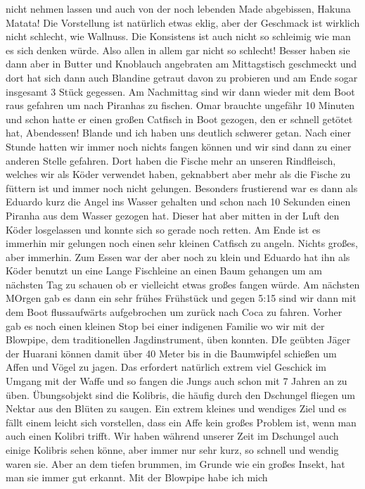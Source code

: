 \documentclass[11pt]{book}
\begin{document}
nicht nehmen lassen und auch von der noch lebenden Made abgebissen, Hakuna Matata! Die Vorstellung ist natürlich etwas eklig, aber der Geschmack ist 
wirklich nicht schlecht, wie Wallnuss. Die Konsistens ist auch nicht so schleimig wie man es sich denken würde. Also allen in allem gar nicht so schlecht!
Besser haben sie dann aber in Butter und Knoblauch angebraten am Mittagstisch geschmeckt und dort hat sich dann auch Blandine getraut davon zu probieren 
und am Ende sogar insgesamt 3 Stück gegessen. Am Nachmittag sind wir dann wieder mit dem Boot raus gefahren um nach Piranhas zu fischen. Omar brauchte 
ungefähr 10 Minuten und schon hatte er einen großen Catfisch in Boot gezogen, den er schnell getötet hat, Abendessen! Blande und ich haben uns deutlich 
schwerer getan. Nach einer Stunde hatten wir immer noch nichts fangen können und wir sind dann zu einer anderen Stelle gefahren. Dort haben die Fische 
mehr an unseren Rindfleisch, welches wir als Köder verwendet haben, geknabbert aber mehr als die Fische zu füttern ist und immer noch nicht gelungen. 
Besonders frustierend war es dann als Eduardo kurz die Angel ins Wasser gehalten und schon nach 10 Sekunden einen Piranha aus dem Wasser gezogen hat. Dieser 
hat aber mitten in der Luft den Köder losgelassen und konnte sich so gerade noch retten. Am Ende ist es immerhin mir gelungen noch einen sehr kleinen 
Catfisch zu angeln. Nichts großes, aber immerhin. Zum Essen war der aber noch zu klein und Eduardo hat ihn als Köder benutzt un eine Lange Fischleine 
an einen Baum gehangen um am nächsten Tag zu schauen ob er vielleicht etwas großes fangen würde. 
Am nächsten MOrgen gab es dann ein sehr frühes Frühstück und gegen 5:15 sind wir dann mit dem Boot flussaufwärts aufgebrochen um zurück nach Coca zu 
fahren. Vorher gab es noch einen kleinen Stop bei einer indigenen Familie wo wir mit der Blowpipe, dem traditionellen Jagdinstrument, üben konnten. 
DIe geübten Jäger der Huarani können damit über 40 Meter bis in die Baumwipfel schießen um Affen und Vögel zu jagen. Das erfordert natürlich extrem viel 
Geschick im Umgang mit der Waffe und so fangen die Jungs auch schon mit 7 Jahren an zu üben. Übungsobjekt sind die Kolibris, die häufig durch den Dschungel 
fliegen um Nektar aus den Blüten zu saugen. Ein extrem kleines und wendiges Ziel und es fällt einem leicht sich vorstellen, dass ein Affe kein großes 
Problem ist, wenn man auch einen Kolibri trifft. Wir haben während unserer Zeit im Dschungel auch einige Kolibris sehen könne, aber immer nur sehr kurz, 
so schnell und wendig waren sie. Aber an dem tiefen brummen, im Grunde wie ein großes Insekt, hat man sie immer gut erkannt. Mit der Blowpipe habe ich mich 
\end{document}

